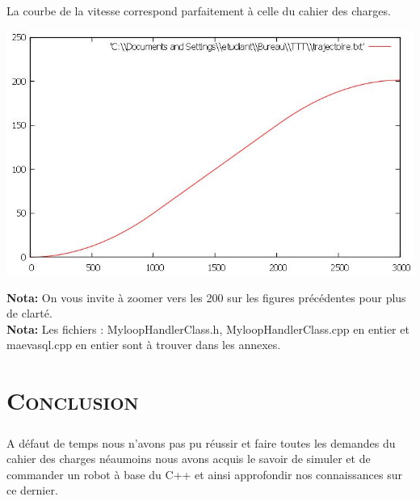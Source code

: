 	\par La courbe de la vitesse correspond parfaitement à celle du cahier des charges. 

	 \begin{center}
	\includegraphics[scale=0.6]{Y.JPG}
	\label{fig4} 
	\end{center}
	
	\textbf{Nota:} On vous invite à zoomer vers les 200 \text{\%} sur les figures précédentes pour plus de clarté.\\
	
	\textbf{Nota:} Les fichiers : MyloopHandlerClass.h, MyloopHandlerClass.cpp en entier et maeva\text{\_}sql.cpp en entier sont à trouver dans les annexes.\\ 		
	
	\chapter*{\textsc{Conclusion}}

	\paragraph{} A défaut de temps nous n'avons pas pu réussir et faire toutes les demandes du cahier des charges néaumoins nous avons acquis le savoir de simuler et de commander un robot à base du C++ et ainsi approfondir nos connaissances sur ce dernier.